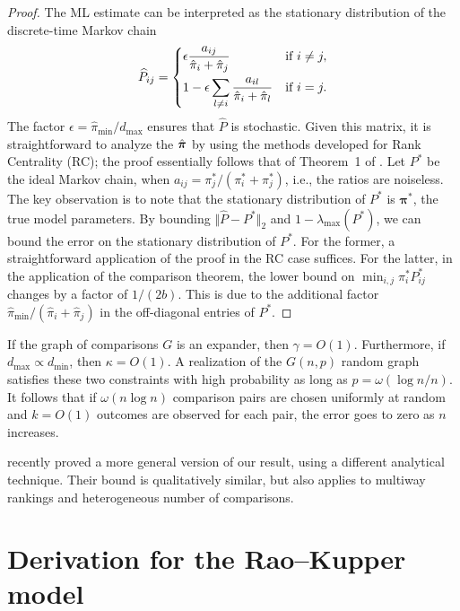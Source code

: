 \begin{proof}
The ML estimate can be interpreted as the stationary distribution of the discrete-time Markov chain
\begin{align}
\label{eq:mlchain}
  \widehat{P}_{ij} =
  \begin{dcases}
    \epsilon \frac{a_{ij}}{\hat{\pi}_i + \hat{\pi}_j}                    & \text{if } i \ne j, \\
    1 - \epsilon \sum_{l \ne i} \frac{a_{il}}{\hat{\pi}_i + \hat{\pi}_l} & \text{if } i = j.
  \end{dcases}
\end{align}
The factor $\epsilon = \hat{\pi}_{\min} / d_{\max}$ ensures that $\widehat{P}$ is stochastic.
Given this matrix, it is straightforward to analyze the $\hat{\bm{\pi}}$ by using the methods developed for Rank Centrality (RC);
the proof essentially follows that of Theorem~1 of \citet{negahban2014rank}.
Let $P^*$ be the ideal Markov chain, when  $a_{ij} = \pi^*_j / (\pi^*_i + \pi^*_j)$, i.e., the ratios are noiseless.
The key observation is to note that the stationary distribution of $P^*$ is $\bm{\pi}^*$, the true model parameters.
By bounding $\Vert \widehat{P} - P^* \Vert_2$ and $1 - \lambda_{\max}(P^*)$, we can bound the error on the stationary distribution of $P^*$.
For the former, a straightforward application of the proof in the RC case suffices.
For the latter, in the application of the comparison theorem, the lower bound on $\min_{i,j} \pi^*_i P^*_{ij}$ changes by a factor of $1/(2b)$.
This is due to the additional factor $\hat{\pi}_{\min} / (\hat{\pi}_i + \hat{\pi}_j)$ in the off-diagonal entries of $P^*$.
\end{proof}

If the graph of comparisons $G$ is an expander, then $\gamma = O(1)$.
Furthermore, if $d_{\max} \propto d_{\min}$, then $\kappa = O(1)$.
A realization of the $G(n, p)$ random graph satisfies these two constraints with high probability as long as $p = \omega(\log n / n)$.
It follows that if $\omega(n \log n)$ comparison pairs are chosen uniformly at random and $k = O(1)$ outcomes are observed for each pair, the error goes to zero as $n$ increases.

\citet{hajek2014minimax} recently proved a more general version of our result, using a different analytical technique.
Their bound is qualitatively similar, but also applies to multiway rankings and heterogeneous number of comparisons.

\section{Derivation for the Rao--Kupper model}

